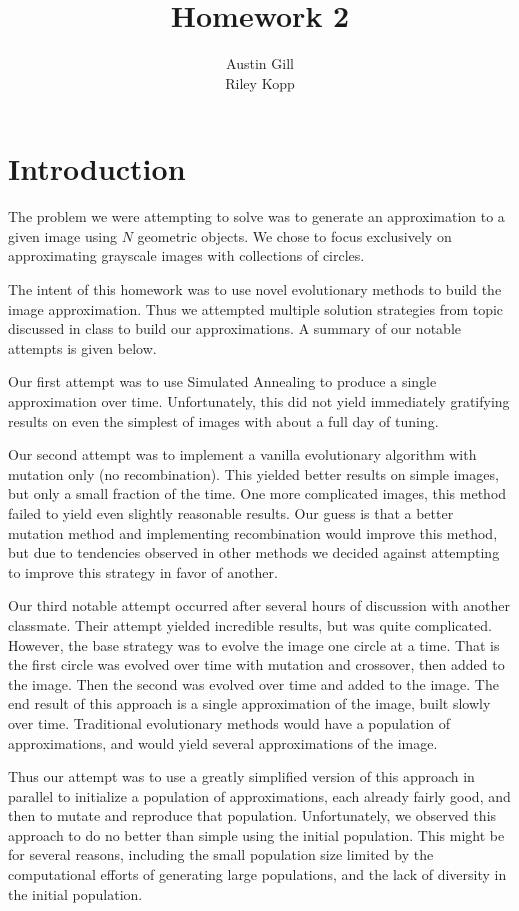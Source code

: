 \documentclass{article}
\title{Homework 2}
\author{Austin Gill \\ Riley Kopp}
\begin{document}
\maketitle
\begingroup
\hypersetup{linkcolor=black}
\tableofcontents
\endgroup
\newpage

\section{Introduction}\label{sec:introduction}
The problem we were attempting to solve was to generate an approximation to a given image using
$N$ geometric objects. We chose to focus exclusively on approximating grayscale images with
collections of circles.

The intent of this homework was to use novel evolutionary methods to build the image
approximation. Thus we attempted multiple solution strategies from topic discussed in class to
build our approximations. A summary of our notable attempts is given below.

Our first attempt was to use Simulated Annealing to produce a single approximation over time.
Unfortunately, this did not yield immediately gratifying results on even the simplest of images
with about a full day of tuning.

Our second attempt was to implement a vanilla evolutionary algorithm with mutation only (no
recombination). This yielded better results on simple images, but only a small fraction of the
time. One more complicated images, this method failed to yield even slightly reasonable results.
Our guess is that a better mutation method and implementing recombination would improve this
method, but due to tendencies observed in other methods we decided against attempting to improve
this strategy in favor of another.

Our third notable attempt occurred after several hours of discussion with another classmate.
Their attempt yielded incredible results, but was quite complicated. However, the base strategy was
to evolve the image one circle at a time. That is the first circle was evolved over time with
mutation and crossover, then added to the image. Then the second was evolved over time and added to
the image. The end result of this approach is a single approximation of the image, built slowly
over time. Traditional evolutionary methods would have a population of approximations, and would
yield several approximations of the image.

Thus our attempt was to use a greatly simplified version of this approach in parallel to
initialize a population of approximations, each already fairly good, and then to mutate and
reproduce that population. Unfortunately, we observed this approach to do no better than simple
using the initial population. This might be for several reasons, including the small population
size limited by the computational efforts of generating large populations, and the lack of
diversity in the initial population.
\end{document}
